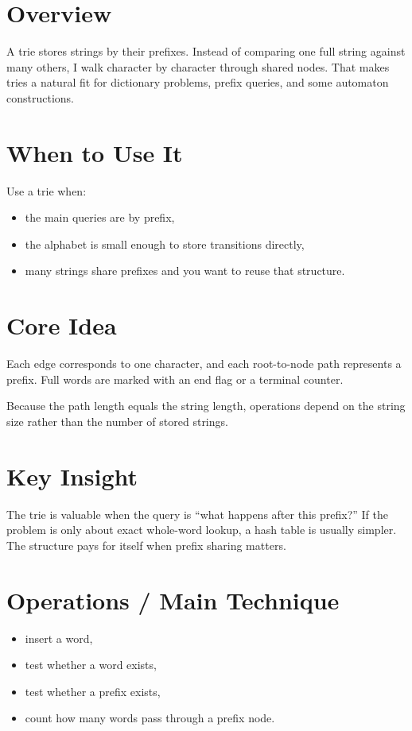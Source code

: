 \section*{Overview}

A trie stores strings by their prefixes. Instead of comparing one full string against many others, I walk character by
character through shared nodes. That makes tries a natural fit for dictionary problems, prefix queries, and some
automaton constructions.

\section*{When to Use It}

Use a trie when:

\begin{itemize}
  \item the main queries are by prefix,
  \item the alphabet is small enough to store transitions directly,
  \item many strings share prefixes and you want to reuse that structure.
\end{itemize}

\section*{Core Idea}

Each edge corresponds to one character, and each root-to-node path represents a prefix. Full words are marked with an
end flag or a terminal counter.

Because the path length equals the string length, operations depend on the string size rather than the number of stored
strings.

\section*{Key Insight}

The trie is valuable when the query is ``what happens after this prefix?'' If the problem is only about exact whole-word
lookup, a hash table is usually simpler. The structure pays for itself when prefix sharing matters.

\section*{Operations / Main Technique}

\begin{itemize}
  \item insert a word,
  \item test whether a word exists,
  \item test whether a prefix exists,
  \item count how many words pass through a prefix node.
\end{itemize}

